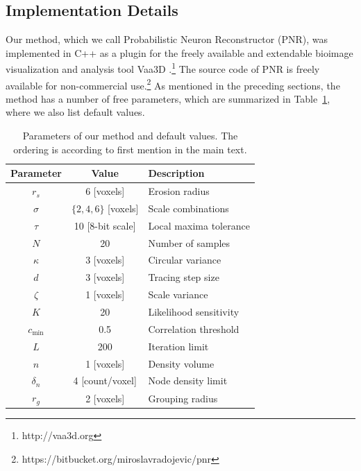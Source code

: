 \subsection{Implementation Details}
\label{subsec:implementation}
Our method, which we call Probabilistic Neuron Reconstructor (PNR), was implemented in C++ as a plugin for the freely available and extendable bioimage visualization and analysis tool Vaa3D \cite{peng2010v3d, peng2014extensible}.\footnote{http://vaa3d.org} The source code of PNR is freely available for non-commercial use.\footnote{https://bitbucket.org/miroslavradojevic/pnr} As mentioned in the preceding sections, the method has a number of free parameters, which are summarized in Table~\ref{tab:params}, where we also list default values.

\begin{table}%
	\small\centering
	\begin{tabular}{@{}c@{\hspace{1em}}c@{\hspace{2em}}l@{}}
		\hline
		Parameter & Value & Description \\
		\hline
		$r_s$ & 6 [voxels] & Erosion radius \\
		$\sigma$ & $\{ 2,4,6 \}$ [voxels]  & Scale combinations \\ %
		$\tau$ & 10 [8-bit scale] & Local maxima tolerance \\ %
		$N$ & 20 & Number of samples \\
		$\kappa$ & 3 [voxels] & Circular variance \\
		$d$ & 3 [voxels] & Tracing step size \\
		$\zeta$ & 1 [voxels] & Scale variance \\
		$K$ & 20 & Likelihood sensitivity \\
		$c_{\text{min}}$ & 0.5 & Correlation threshold \\ %
		$L$ & 200 & Iteration limit \\
		$n$ & 1 [voxels] & Density volume \\
		$\delta_n$ & 4 [count/voxel] & Node density limit \\
		$r_g$ & 2 [voxels] & Grouping radius \\
		\hline
	\end{tabular}
	\caption{Parameters of our method and default values. The ordering is according to first mention in the main text.}
	\label{tab:params}
\end{table}

